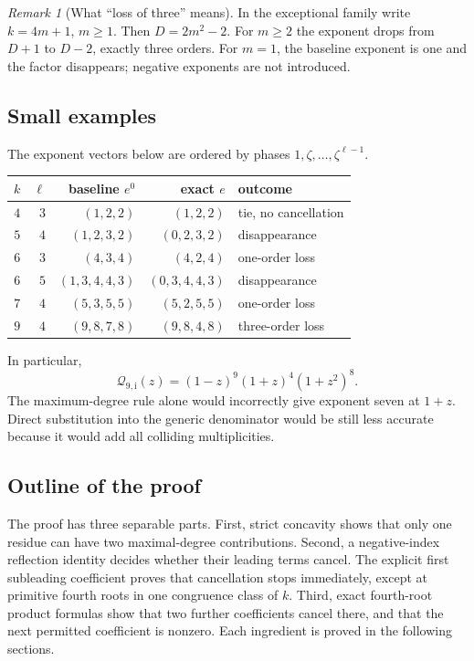 \documentclass[11pt]{article}
\theoremstyle{definition}
\theoremstyle{remark}
\newtheorem{remark}[theorem]{Remark}
\newcommand{\QQ}{\mathscr Q}
\newcommand{\ii}{\mathrm i}
\theoremstyle{definition}
\theoremstyle{plain}
\numberwithin{equation}{section}
\begin{document}
\begin{remark}[What ``loss of three'' means]
In the exceptional family write $k=4m+1$, $m\ge1$. Then
$D=2m^2-2$. For $m\ge2$ the exponent drops from $D+1$ to $D-2$,
exactly three orders. For $m=1$, the baseline exponent is one and the
factor disappears; negative exponents are not introduced.
\end{remark}

\subsection{Small examples}
The exponent vectors below are ordered by phases
$1,\zeta,\ldots,\zeta^{\ell-1}$.
\begin{center}
\begin{tabular}{@{}rrrrl@{}}
\toprule
$k$ & $\ell$ & baseline $e^0$ & exact $e$ & outcome\\
\midrule
$4$ & $3$ & $(1,2,2)$ & $(1,2,2)$ & tie, no cancellation\\
$5$ & $4$ & $(1,2,3,2)$ & $(0,2,3,2)$ & disappearance\\
$6$ & $3$ & $(4,3,4)$ & $(4,2,4)$ & one-order loss\\
$6$ & $5$ & $(1,3,4,4,3)$ & $(0,3,4,4,3)$ & disappearance\\
$7$ & $4$ & $(5,3,5,5)$ & $(5,2,5,5)$ & one-order loss\\
$9$ & $4$ & $(9,8,7,8)$ & $(9,8,4,8)$ & three-order loss\\
\bottomrule
\end{tabular}
\end{center}
In particular,
\begin{equation}
 \QQ_{9,\ii}(z)=(1-z)^9(1+z)^4(1+z^2)^8.
 \label{cp:eq:k9}
\end{equation}
The maximum-degree rule alone would incorrectly give exponent seven at
$1+z$. Direct substitution into the generic denominator would be still
less accurate because it would add all colliding multiplicities.

\subsection{Outline of the proof}
The proof has three separable parts. First, strict concavity shows that only
one residue can have two maximal-degree contributions. Second, a negative-index
reflection identity decides whether their leading terms cancel. The explicit
first subleading coefficient proves that cancellation stops immediately,
except at primitive fourth roots in one congruence class of $k$.
Third, exact fourth-root product formulas show that two further coefficients
cancel there, and that the next permitted coefficient is nonzero.
Each ingredient is proved in the following sections.
\end{document}

